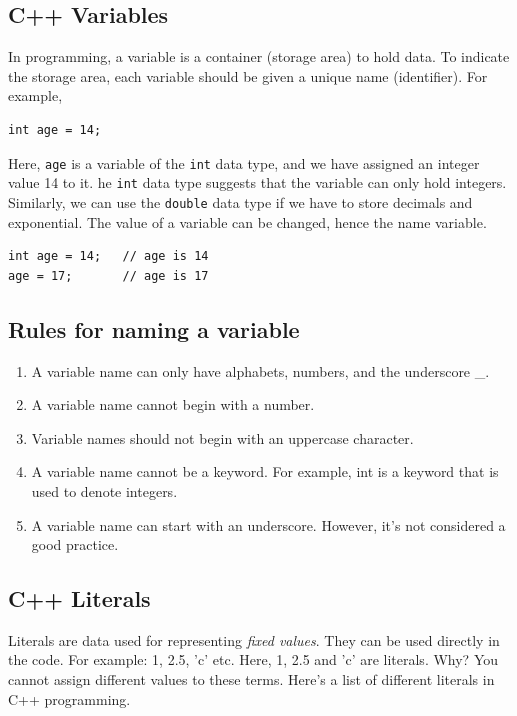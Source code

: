 \documentclass{book}
\begin{document}
\subsection{C++ Variables}

In programming, a variable is a container (storage area) to hold data. To indicate the storage area, each variable should be given a unique name (identifier). For example,

\begin{verbatim}
int age = 14;
\end{verbatim}

Here, \texttt{age} is a variable of the \texttt{int} data type, and we have assigned an integer value 14 to it. he \texttt{int} data type suggests that the variable can only hold integers. Similarly, we can use the \texttt{double} data type if we have to store decimals and exponential. The value of a variable can be changed, hence the name variable.

\begin{verbatim}
int age = 14;   // age is 14
age = 17;       // age is 17
\end{verbatim}

\subsection{Rules for naming a variable}

\begin{enumerate}
	\item A variable name can only have alphabets, numbers, and the underscore \_.
\item A variable name cannot begin with a number.
\item Variable names should not begin with an uppercase character.
\item A variable name cannot be a keyword. For example, int is a keyword that is used to denote integers.
\item A variable name can start with an underscore. However, it's not considered a good practice.
\end{enumerate}

\subsection{C++ Literals}

Literals are data used for representing \textit{fixed values}. They can be used directly in the code. For example: 1, 2.5, 'c' etc. Here, 1, 2.5 and 'c' are literals. Why? You cannot assign different values to these terms. Here's a list of different literals in C++ programming.
\end{document}
